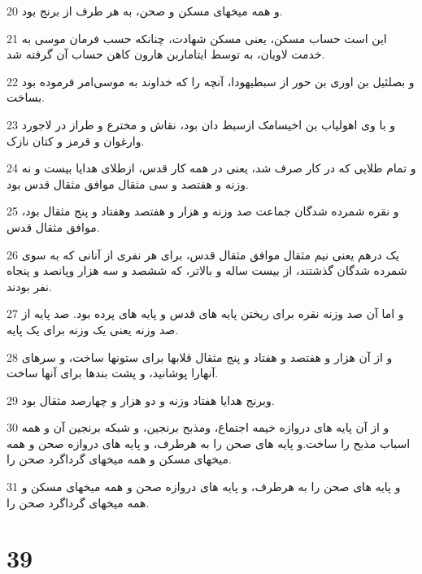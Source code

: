 \par 20 و همه میخهای مسکن و صحن، به هر طرف از برنج بود.
\par 21 این است حساب مسکن، یعنی مسکن شهادت، چنانکه حسب فرمان موسی به خدمت لاویان، به توسط ایتاماربن هارون کاهن حساب آن گرفته شد.
\par 22 و بصلئیل بن اوری بن حور از سبطیهودا، آنچه را که خداوند به موسی‌امر فرموده بود بساخت.
\par 23 و با وی اهولیاب بن اخیسامک ازسبط دان بود، نقاش و مخترع و طراز در لاجورد وارغوان و قرمز و کتان نازک.
\par 24 و تمام طلایی که در کار صرف شد، یعنی در همه کار قدس، ازطلای هدایا بیست و نه وزنه و هفتصد و سی مثقال موافق مثقال قدس بود.
\par 25 و نقره شمرده شدگان جماعت صد وزنه و هزار و هفتصد وهفتاد و پنج مثقال بود، موافق مثقال قدس.
\par 26 یک درهم یعنی نیم مثقال موافق مثقال قدس، برای هر نفری از آنانی که به سوی شمرده شدگان گذشتند، از بیست ساله و بالاتر، که ششصد و سه هزار وپانصد و پنجاه نفر بودند.
\par 27 و اما آن صد وزنه نقره برای ریختن پایه های قدس و پایه های پرده بود. صد پایه از صد وزنه یعنی یک وزنه برای یک پایه.
\par 28 و از آن هزار و هفتصد و هفتاد و پنج مثقال قلابها برای ستونها ساخت، و سرهای آنهارا پوشانید، و پشت بندها برای آنها ساخت.
\par 29 وبرنج هدایا هفتاد وزنه و دو هزار و چهارصد مثقال بود.
\par 30 و از آن پایه های دروازه خیمه اجتماع، ومذبح برنجین، و شبکه برنجین آن و همه اسباب مذبح را ساخت.و پایه های صحن را به هرطرف، و پایه های دروازه صحن و همه میخهای مسکن و همه میخهای گرداگرد صحن را.
\par 31 و پایه های صحن را به هرطرف، و پایه های دروازه صحن و همه میخهای مسکن و همه میخهای گرداگرد صحن را.
 
\chapter{39}

